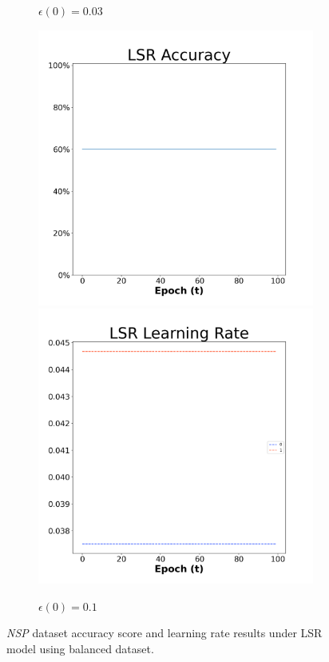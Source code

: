 \begin{figure}[H]
\begin{subfigure}{0.3\textwidth}
  \caption{$\epsilon(0)=0.03$}
\end{subfigure}\hfil %
\begin{subfigure}{0.3\textwidth}
  \includegraphics[width=\linewidth]{images/exper1/NSP/LSR_0.1_acc.png}
  \includegraphics[width=\linewidth]{images/exper1/NSP/LSR_0.1_lr.png}
  \caption{$\epsilon(0)=0.1$}
\end{subfigure}

\caption{\textit{NSP} dataset accuracy score and learning rate results under LSR model using balanced dataset.}
\end{figure}

